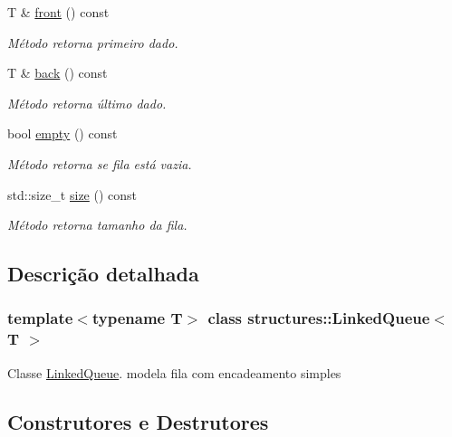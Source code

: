 \begin{DoxyCompactItemize}
T \& \mbox{\hyperlink{classstructures_1_1LinkedQueue_a904219098f1f6b3aa229a8ea0f929b64}{front}} () const
\begin{DoxyCompactList}\small\item\em Método retorna primeiro dado. \end{DoxyCompactList}\item 
T \& \mbox{\hyperlink{classstructures_1_1LinkedQueue_ac69ee50f58e8501f7eaddec5b474a87c}{back}} () const
\begin{DoxyCompactList}\small\item\em Método retorna último dado. \end{DoxyCompactList}\item 
bool \mbox{\hyperlink{classstructures_1_1LinkedQueue_a24995d6b61ce9e8d05718c966b699c5a}{empty}} () const
\begin{DoxyCompactList}\small\item\em Método retorna se fila está vazia. \end{DoxyCompactList}\item 
std\+::size\+\_\+t \mbox{\hyperlink{classstructures_1_1LinkedQueue_ab86b0d95b796c277a21b89f106efd173}{size}} () const
\begin{DoxyCompactList}\small\item\em Método retorna tamanho da fila. \end{DoxyCompactList}\end{DoxyCompactItemize}


\subsection{Descrição detalhada}
\subsubsection*{template$<$typename T$>$\newline
class structures\+::\+Linked\+Queue$<$ T $>$}

Classe \mbox{\hyperlink{classstructures_1_1LinkedQueue}{Linked\+Queue}}. modela fila com encadeamento simples 

\subsection{Construtores e Destrutores}
\mbox{\label{classstructures_1_1LinkedQueue_aae2a207f04610f5bb460de8b4f5c7650}} 
